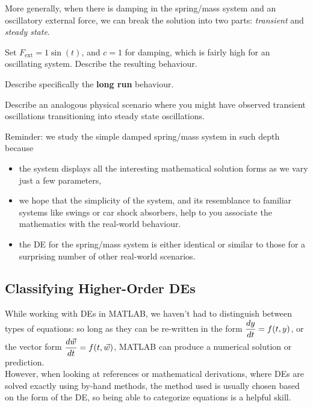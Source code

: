More generally, when there is damping in the spring/mass system and an
oscillatory external force, we can break the solution into two parts:
{\em transient} and {\em steady state}.

\problem Set $F_{\mbox{ext}} = 1 \sin(t)$, and $c = 1$ for damping,
which is fairly high for an oscillating system.  Describe the
resulting behaviour.

\vfill

Describe specifically the {\bf long run} behaviour.

\vfill

\newpage

\problem Describe an analogous physical scenario where you might have
observed transient oscillations transitioning into steady state
oscillations.



\newpage

Reminder: we study the simple damped spring/mass system in such depth
because
\begin{itemize}
\item the system displays all the interesting mathematical solution
  forms as we vary just a few parameters, 
\item we hope that the simplicity of the system, and its resemblance
  to familiar systems like swings or car shock absorbers, help to you
  associate the mathematics with the real-world behaviour.
\item the DE for the spring/mass system is either identical or similar
  to those for a surprising number of other real-world scenarios.
\end{itemize}



\newpage

\subsection*{Classifying Higher-Order DEs}

While working with DEs in MATLAB, we haven't had to distinguish
between types of equations: so long as they can be re-written in the
form $\displaystyle \frac{dy}{dt} = f(t, y)$, or the vector form
$\displaystyle \frac{d\vec{w}}{dt} = f(t, \vec{w})$, MATLAB can produce a
numerical solution or prediction. \\[1ex]

However, when looking at references or mathematical derivations, where
DEs are solved exactly using by-hand methods, the method used is
usually chosen based on the form of the DE, so being able to
categorize equations is a helpful skill.

